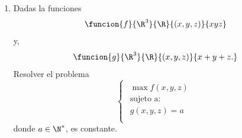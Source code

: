 \documentclass[a4,11pt]{aleph-examen}
\begin{document}
\begin{preguntas}
\begin{respuesta}
\begin{respuesta}
\begin{respuesta}
\begin{enumerate}
\begin{respuesta}
\[\begin{pmatrix}
            -1 & 6 & 2 & 0\\
            -1 & 2 & 6 & 0\\
            -1 & 0 & 0 & 2
        \end{pmatrix},
    \]
    \[
        H_L(a_2)=
        \begin{pmatrix}
            0 & 1 & 1 & -1\\
            1 & 6 & 2 & 0\\
            1 & 2 & 6 & 0\\
            -1 & 0 & 0 & 2
        \end{pmatrix},
    \]
    \[
        H_L(a_3)=
        \begin{pmatrix}
            0 & 1 & -1 & -1\\
            1 & 6 & -2 & 0\\
            -1 & -2 & 6 & 0\\
            -1 & 0 & 0 & 2 
        \end{pmatrix}
    \]
    y
    \[
        H_L(a_4)=
        \begin{pmatrix}
            0 & -1 & 1 & -1\\
            -1 & 6 & -2 & 0\\
            1 & -2 & 6 & 0\\
            -1 & 0 & 0 & 2
        \end{pmatrix}.
    \]
    Por otro lado se tiene que $n=3$ y $m=1$ entonces se calcula para cada punto crítico $(-1)^mdet(H_{2m+1})$ y $(-1)^mdet(H_{m+n})$, entonces
    \[
        -det(H_{L_3}(a_1))=8 \texty -det(H_{L_4}(a_1))=48,
    \]
    \[
        -det(H_{L_3}(a_2))=8 \texty -det(H_{L_4}(a_2))=48,
    \]
    \[
        -det(H_{L_3}(a_3))=8 \texty -det(H_{L_4}(a_3))=48,
    \]
    \[
        -det(H_{L_3}(a_4))=8 \texty -det(H_{L_4}(a_4))=48.
    \]
    Se puede notar que, para todos los puntos críticos, la secuencia de determinantes consta solamente de número positivos, entonces $d$ tiene un mínimo, con un valor de 3, en todos los puntos críticos.
\end{respuesta}

\item 
    Dadas la funciones
    \[
         \funcion{f}{\R^3}{\R}{(x,y,z)}{xyz}
    \]
  	y,
	\[
        \funcion{g}{\R^3}{\R}{(x,y,z)}{x + y+ z.}
    \] 
    Resolver el problema 
    \[
        \begin{cases}
        \begin{array}{c}
		\max f(x,y,z)\\
		\text{sujeto  a:}\\
			g(x,y,z)=a\\		
		\end{array}
        \end{cases} 
    \]
    donde $a\in\N^{*}$, es constante.
    

\end{enumerate}
\end{respuesta}
\end{respuesta}
\end{respuesta}
\end{preguntas}
\end{document}
